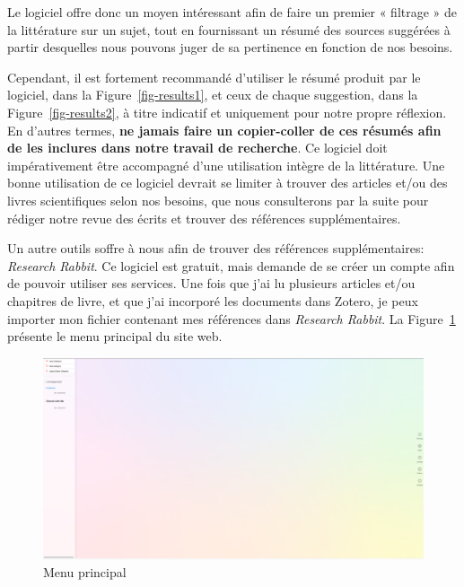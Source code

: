 \documentclass[
  letterpaper,
]{scrbook}
\begin{document}
Le logiciel offre donc un moyen intéressant afin de faire un premier «
filtrage » de la littérature sur un sujet, tout en fournissant un résumé
des sources suggérées à partir desquelles nous pouvons juger de sa
pertinence en fonction de nos besoins.

Cependant, il est fortement recommandé d'utiliser le résumé produit par
le logiciel, dans la Figure~\ref{fig-results1}, et ceux de chaque
suggestion, dans la Figure~\ref{fig-results2}, à titre indicatif et
uniquement pour notre propre réflexion. En d'autres termes, \textbf{ne
jamais faire un copier-coller de ces résumés afin de les inclures dans
notre travail de recherche}. Ce logiciel doit impérativement être
accompagné d'une utilisation intègre de la littérature. Une bonne
utilisation de ce logiciel devrait se limiter à trouver des articles
et/ou des livres scientifiques selon nos besoins, que nous consulterons
par la suite pour rédiger notre revue des écrits et trouver des
références supplémentaires.

Un autre outils soffre à nous afin de trouver des références
supplémentaires: \emph{Research Rabbit}. Ce logiciel est gratuit, mais
demande de se créer un compte afin de pouvoir utiliser ses services. Une
fois que j'ai lu plusieurs articles et/ou chapitres de livre, et que
j'ai incorporé les documents dans Zotero, je peux importer mon fichier
contenant mes références dans \emph{Research Rabbit}. La
Figure~\ref{fig-rr1} présente le menu principal du site web.

\begin{figure}

{\centering \includegraphics{images/chapitre9_RR1.png}

}

\caption{\label{fig-rr1}Menu principal}

\end{figure}
\end{document}
